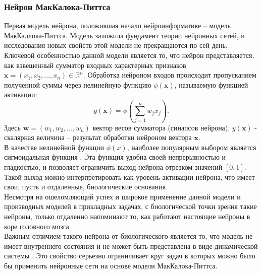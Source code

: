 \documentclass[a4paper,10pt]{article}
\begin{document}
\subsubsection{Нейрон МакКалока-Питтса}
   Первая модель нейрона, положившая начало нейроинформатике -- модель МакКаллока-Питтса. Модель заложила фундамент теории нейронных сетей, и исследования новых свойств этой модели не прекращаются по сей день.\\
   \indent Ключевой особенностью данной модели является то, что нейрон представляется, как взвешенный сумматор входных характерных признаков $\boldsymbol{x}=(x_{1},x_{2},...,x_{n}) \in \mathbb{R}^n$. Обработка нейроном входов происходит пропусканием полученной суммы через нелинейную функцию $\phi(\boldsymbol{x})$, называемую функцией активации:\\
   \begin{equation}\label{eq:sum_mp}
   y(\boldsymbol{x}) = \phi(\sum_{j=1}^{n}w_{j}x_{j}).
   \end{equation}
\indent Здесь $\boldsymbol{w}=(w_{1}, w_{2},...,w_{n})$ вектор весов сумматора (синапсов нейрона), $y(\boldsymbol{x})$ - скалярная величина -- результат обработки нейроном вектора $\boldsymbol{x}$.\\	
	\indent В качестве нелинейной функции $\phi(x)$, наиболее популярным выбором является сигмоидальная функция \cite{Zaencev1999}. Эта функция удобна своей непрерывностью и гладкостью, и позволяет ограничить выход нейрона  отрезком значений $[0,1]$. Такой выход можно интерпретировать как уровень активации нейрона, что имеет свои, пусть и отдаленные, биологические основания. \\
   \indent Несмотря на ошеломляющий успех и широкое применение данной модели  и производных моделей в прикладных задачах, с биологической точки зрения такие нейроны, только отдаленно напоминают то, как работают настоящие нейроны в коре головного мозга.\\
   \indent Важным отличием такого нейрона от биологического является то, что модель не имеет внутреннего состояния и не может быть представлена в виде динамической системы \cite{Zaencev1999}. Это свойство серьезно ограничивает круг задач в которых можно было бы применить нейронные сети на основе модели МакКалока-Питтса. 
\end{document}
